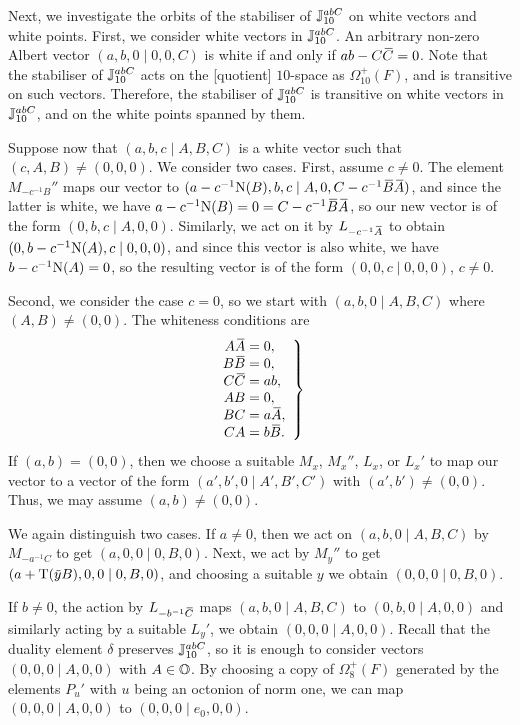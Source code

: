 Next, we investigate the orbits of the stabiliser of $\mathbb{J}_{10}^{abC}$ on white vectors and white points. First, we consider white vectors
in $\mathbb{J}_{10}^{abC}$. An arbitrary non-zero Albert vector $(a,b,0\mid 0,0,C)$ is white if and only if $a b - C\mathord{\mbox{\hspace*{0pt}}\,\overline{\!C\!\!\;}\!\:}\mbox{\hspace*{0pt}} = 0$.
Note that the stabiliser of $\mathbb{J}_{10}^{abC}$ acts on the [quotient] $10$-space as $\Omega_{10}^+(F)$, and is transitive on such vectors. 
Therefore, the stabiliser of $\mathbb{J}_{10}^{abC}$ is transitive on white vectors in
$\mathbb{J}_{10}^{abC}$, and on the white points spanned by them. 

Suppose now that $(a,b,c \mid A,B,C)$ is a white vector such that $(c,A,B) \neq (0,0,0)$. We consider two cases.
First, assume $c \neq 0$. The element $M_{-c^{-1} B}''$ maps our vector to $(a - c^{-1}\NN(B), b, c \mid A,0, C-c^{-1}\ovB \ovA)$, and since
the latter is white, we have \mbox{$a - c^{-1}\NN(B) = 0  = C - c^{-1}\ovB\ovA$}, so our new vector is of the form
$(0,b,c \mid A,0,0)$. Similarly, we act on it by $L_{-c^{-1} \mathord{\mbox{\hspace*{0pt}}\,\overline{\!A\!\!\;}\!\:}\mbox{\hspace*{0pt}}}$ to obtain $(0,b-c^{-1}\mathord{\mathrm{N}}(A),c \mid 0,0,0)$, and since this vector is also 
white, we have $b - c^{-1} \mathord{\mathrm{N}}(A) = 0$, so the resulting vector is of the form $(0,0,c\mid 0,0,0)$, $c \neq 0$. 

Second, we consider the case $c = 0$, so we start with $(a,b,0\mid A,B,C)$ where $(A,B) \neq (0,0)$. The whiteness conditions are
\begin{equation}
	\left.
	\begin{array}{r@{\;}c@{\;}l}
		A\ovA & = & 0, \\
		B\ovB & = & 0, \\
		C\ovC & = & ab, \\
		AB & = & 0, \\
		BC & = & a\ovA, \\
		CA & = & b\ovB. 
	\end{array}
	\right\}
\end{equation}
If $(a,b) = (0, 0)$, then we choose a suitable $M_x$, $M_x''$, $L_x$, or $L_x'$ to map our vector to a vector of the form
$(a',b',0\mid A',B',C')$ with $(a',b') \neq (0,0)$. Thus, we may assume $(a,b) \neq (0,0)$. 

We again distinguish two cases. 
If $a \neq 0$, then we act on $(a,b,0\mid A,B,C)$ by $M_{-a^{-1} C}$ to get $(a,0,0\mid 0,B,0)$. Next, we act by 
$M_y''$ to get \mbox{$(a + \operatorname{T}(\mathord{\mbox{\hspace*{0pt}}\,\overline{\!y\!\!\;}\!\:}\mbox{\hspace*{0pt}} B), 0, 0 \mid 0,B,0)$}, and choosing a suitable $y$ we obtain $(0,0,0\mid 0,B,0)$.

If $b \neq 0$, the action by $L_{-b^{-1} \mathord{\mbox{\hspace*{0pt}}\,\overline{\!C\!\!\;}\!\:}\mbox{\hspace*{0pt}}}$ maps $(a,b,0\mid A,B,C)$ to \mbox{$(0,b,0\mid A,0,0)$} and 
similarly acting by a suitable $L_y'$, we obtain $(0,0,0\mid A,0,0)$. Recall that the duality element $\delta$ preserves 
$\mathbb{J}_{10}^{abC}$, so it is enough to consider vectors $(0,0,0\mid A,0,0)$ with $A \in \mathbb{O}$. By choosing a copy of $\Omega_8^+(F)$ 
generated by the elements $P_u'$ with $u$ being an octonion of norm one, we can map $(0,0,0\mid A,0,0)$ to 
$(0,0,0\mid e_0, 0,0)$.

